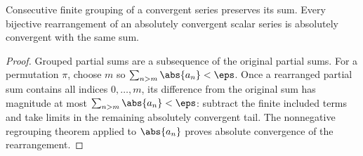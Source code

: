 \begin{theorem}
Consecutive finite grouping of a convergent series preserves its sum. Every bijective rearrangement of an absolutely convergent scalar series is absolutely convergent with the same sum.
\end{theorem}
\begin{proof}
Grouped partial sums are a subsequence of the original partial sums. For a permutation $\pi$, choose $m$ so $\sum_{n>m}\abs{a_n}<\eps$. Once a rearranged partial sum contains all indices $0,\ldots,m$, its difference from the original sum has magnitude at most $\sum_{n>m}\abs{a_n}<\eps$: subtract the finite included terms and take limits in the remaining absolutely convergent tail. The nonnegative regrouping theorem applied to $\abs{a_n}$ proves absolute convergence of the rearrangement.
\end{proof}


